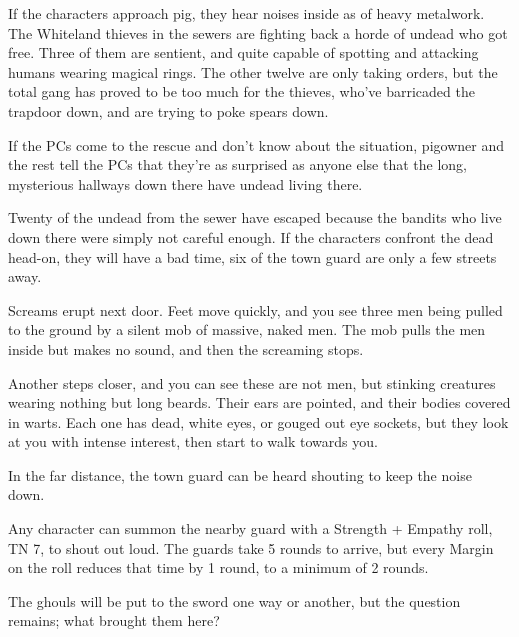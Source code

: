 \begin{multicols}{2}

\humanfarmer

If the characters approach \gls{pig}, they hear noises inside as of heavy metalwork.  The Whiteland thieves in the sewers are fighting back a horde of undead who got free.  Three of them are sentient, and quite capable of spotting and attacking humans wearing magical rings.  The other twelve are only taking orders, but the total gang has proved to be too much for the thieves, who've barricaded the trapdoor down, and are trying to poke spears down.

If the PCs come to the rescue and don't know about the situation, \gls{pigowner} and the rest tell the PCs that they're as surprised as anyone else that the long, mysterious hallways down there have undead living there.


Twenty of the undead from the sewer have escaped because the bandits who live down there were simply not careful enough.  If the characters confront the dead head-on, they will have a bad time, six of the town guard are only a few streets away.

\begin{boxtext}

	Screams erupt next door.
	Feet move quickly, and you see three men being pulled to the ground by a silent mob of massive, naked men.
	The mob pulls the men inside but makes no sound, and then the screaming stops.

	Another steps closer, and you can see these are not men, but stinking creatures wearing nothing but long beards.
	Their ears are pointed, and their bodies covered in warts.
	Each one has dead, white eyes, or gouged out eye sockets, but they look at you with intense interest, then start to walk towards you.

	In the far distance, the town guard can be heard shouting to keep the noise down.

\end{boxtext}

Any character can summon the nearby guard with a Strength + Empathy roll, TN 7, to shout out loud.
The guards take 5 rounds to arrive, but every Margin on the roll reduces that time by 1 round, to a minimum of 2 rounds.


The ghouls will be put to the sword one way or another, but the question remains; what brought them here?


\end{multicols}
